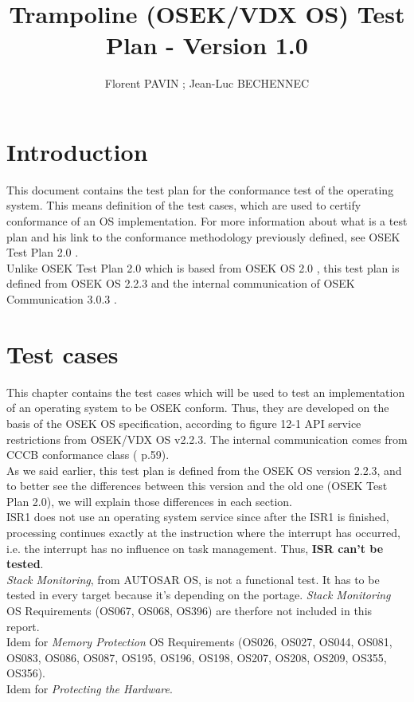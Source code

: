 \documentclass[10pt]{article}
\title{Trampoline (OSEK/VDX OS) Test Plan - Version 1.0}
\author{Florent PAVIN ; Jean-Luc BECHENNEC}
\begin{document}

\maketitle
\tableofcontents

\section{Introduction}
This document contains the test plan for the conformance test of the operating system. This means definition of the test cases, which are used to certify conformance of an OS implementation. For more information about what is a test plan and his link to the conformance methodology previously defined, see OSEK Test Plan 2.0  \cite{OSEK_Test_Plan_20}.\\
Unlike OSEK Test Plan 2.0  which is based from OSEK OS 2.0  \cite{OSEK_OS_20}, this test plan is defined from OSEK OS 2.2.3  \cite{OSEK_OS_223} and the internal communication of OSEK Communication 3.0.3 \cite{OSEK_COM_303} .\\

\section{Test cases}
This chapter contains the test cases which will be used to test an implementation of an operating system to be OSEK conform. Thus, they are developed on the basis of the OSEK OS specification, according to figure 12-1 API service restrictions from OSEK/VDX OS v2.2.3. The internal communication comes from CCCB conformance class (\cite{OSEK_COM_303} p.59).\\
As we said earlier, this test plan is defined from the OSEK OS version 2.2.3, and to better see the differences between this version and the old one (OSEK Test Plan 2.0), we will explain those differences in each section.\\
ISR1 does not use an operating system service since after the ISR1 is finished, processing continues exactly at the instruction where the interrupt has occurred, i.e. the interrupt has no influence on task management. Thus, \textbf{ISR can't be tested}.\\
\textit{Stack Monitoring}, from AUTOSAR OS, is not a functional test. It has to be tested in every target because it's depending on the portage. \textit{Stack Monitoring} OS Requirements (OS067, OS068, OS396) are therfore not included in this report.\\
Idem for \textit{Memory Protection} OS Requirements (OS026, OS027, OS044, OS081, OS083, OS086, OS087, OS195, OS196, OS198, OS207, OS208, OS209, OS355, OS356).\\
Idem for \textit{Protecting the Hardware}.\\
	
\end{document}
